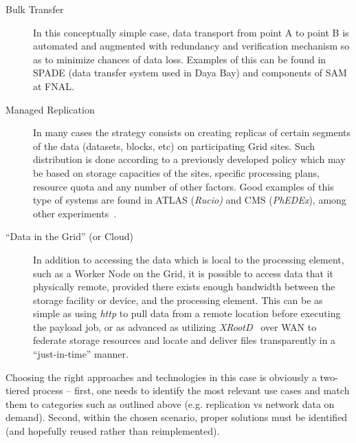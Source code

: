 \begin{description}
\item[Bulk Transfer] In this conceptually simple case, data transport from point A to point B is automated and augmented
with redundancy and verification mechanism so as to minimize chances of data loss. Examples of this can be found in SPADE
(data transfer system used in Daya Bay) and components of SAM at FNAL.

\item[Managed Replication] In many cases the strategy consists on creating replicas of certain segments of the data (datasets, blocks, etc)
on participating Grid sites. Such distribution is done according to a previously developed policy which may be based on storage capacities of 
the sites, specific processing plans, resource quota and any number of other factors. Good examples of this type of systems are found in
ATLAS (\textit{Rucio)} and CMS (\textit{PhEDEx}), among other experiments~\cite{rucio_chep13,phedex_chep09}.

\item[``Data in the Grid'' (or Cloud)] In addition to accessing the data which is local to the processing element, such as a Worker Node
on the Grid, it is possible to access data that it physically remote, provided there exists enough bandwidth between the storage
facility or device, and the processing element. This can be as simple as using \textit{http} to pull data from a remote location before
executing the payload job, or as advanced as utilizing \textit{XRootD}~\cite{xrootd,xrootd_web} over WAN to federate storage resources and locate and
deliver files transparently in a ``just-in-time'' manner.

\end{description}


 Choosing the right approaches and technologies in this case is obviously a two-tiered process -- first, one needs to identify the most
 relevant use cases and match them to categories such as outlined above (e.g. replication vs network data on demand). Second, within
 the chosen scenario, proper solutions must be identified (and hopefully reused rather than reimplemented).
   





